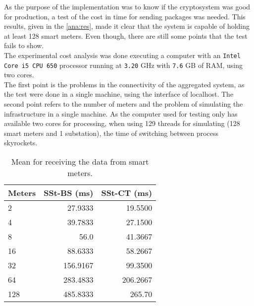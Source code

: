 
   As the purpose of the implementation was to know if the cryptosystem was
   good for production, a test of the cost in time for sending packages was
   needed. This results, given in the \ref{ana:res}, made it clear that
   the system is capable of holding at least 128 smart meters. Even though,
   there are still some points that the test fails to show.\\
   The experimental cost analysis was done executing a computer with an \texttt{Intel Core i5 CPU 650} processor running at \texttt{3.20} GHz with \texttt{7.6} GB of RAM, using two cores.\\
   The first point is the problems in the connectivity of the aggregated system, as the test were done in a single machine, using the interface of localhost.
   The second point refers to the number of meters and the problem of simulating the infrastructure in a single machine. As the computer used for testing only has available two cores for processing, when using 129 threads for simulating (128 smart meters and 1 substation), the time of switching between process skyrockets.
   
   \begin{table}
   		\centering
   		\begin{tabular}{l|rr}
   			Meters & SSt-BS (ms) & SSt-CT (ms) \\ \hline
   			2      &     27.9333 &     19.5500 \\
   			4      &     39.7833 &     27.1500 \\
   			8      &        56.0 &     41.3667 \\
   			16     &     88.6333 &     58.2667 \\
   			32     &    156.9167 &     99.3500 \\
   			64     &    283.4833 &    206.2667 \\
   			128    &    485.8333 &      265.70
   		\end{tabular}
   		\caption{Mean for receiving the data from smart meters.}
   		\label{ana:tab1}
   \end{table}

